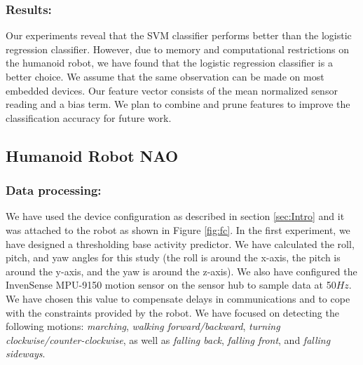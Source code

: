 \documentclass[letterpaper]{article}
\begin{document}
\begin{sloppy}
\subsubsection{Results:}
Our experiments reveal that the SVM classifier performs better than the logistic regression classifier. 
However, due to memory and computational restrictions on the humanoid robot, we have found that the logistic 
regression classifier is a better choice. We assume that the same observation can be made on most embedded 
devices. Our feature vector consists of the mean normalized sensor reading and a bias term. We plan to 
combine and prune features to improve the classification accuracy for future work.  


\subsection{Humanoid Robot NAO}
\subsubsection{Data processing:} 
We have used the device configuration as described in section \ref{sec:Intro}
and it was attached to the robot as shown in Figure \ref{fig:fc}. In the first experiment, we have 
designed a thresholding base activity predictor. We have calculated the roll, pitch, and yaw angles 
for this study (the roll is around the x-axis, the pitch is around the y-axis, and the yaw is around 
the z-axis). We also have configured the InvenSense MPU-9150 motion sensor on the sensor hub to 
sample data at 50$Hz$. We have chosen this value to compensate delays in communications and to cope 
with the constraints provided by the robot. We have focused on detecting the following motions: \textit{marching}, \textit{walking forward/backward}, \textit{turning clockwise/counter-clockwise},
as well as \textit{falling back}, \textit{falling front}, and \textit{falling sideways}.


\end{sloppy}
\end{document}
